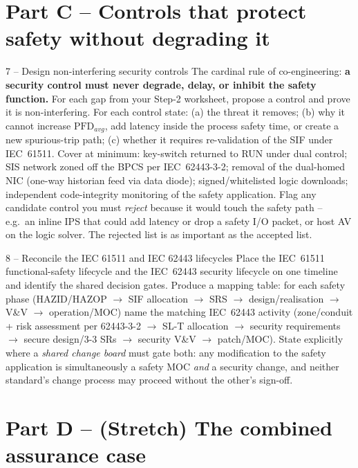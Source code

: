 \documentclass[11pt,a4paper]{article}
\begin{document}
\section*{Part C -- Controls that protect safety without degrading it}

\begin{stepbox}{7 -- Design non-interfering security controls}
The cardinal rule of co-engineering: \textbf{a security control must never
degrade, delay, or inhibit the safety function.} For each gap from your
Step-2 worksheet, propose a control and prove it is non-interfering. For each
control state: (a) the threat it removes; (b) why it cannot increase
$\mathrm{PFD}_{avg}$, add latency inside the process safety time, or create a
new spurious-trip path; (c) whether it requires re-validation of the SIF
under IEC~61511. Cover at minimum: key-switch returned to RUN under dual
control; SIS network zoned off the BPCS per IEC~62443-3-2; removal of the
dual-homed NIC (one-way historian feed via data diode); signed/whitelisted
logic downloads; independent code-integrity monitoring of the safety
application. Flag any candidate control you must \emph{reject} because it
would touch the safety path -- e.g.\ an inline IPS that could add latency or
drop a safety I/O packet, or host AV on the logic solver. The rejected list
is as important as the accepted list.
\end{stepbox}

\begin{stepbox}{8 -- Reconcile the IEC 61511 and IEC 62443 lifecycles}
Place the IEC~61511 functional-safety lifecycle and the IEC~62443
security lifecycle on one timeline and identify the shared decision gates.
Produce a mapping table: for each safety phase (HAZID/HAZOP $\rightarrow$
SIF allocation $\rightarrow$ SRS $\rightarrow$ design/realisation $\rightarrow$
V\&V $\rightarrow$ operation/MOC) name the matching IEC~62443 activity
(zone/conduit + risk assessment per 62443-3-2 $\rightarrow$ SL-T allocation
$\rightarrow$ security requirements $\rightarrow$ secure design/3-3 SRs
$\rightarrow$ security V\&V $\rightarrow$ patch/MOC). State explicitly where a
\emph{shared change board} must gate both: any modification to the safety
application is simultaneously a safety MOC \emph{and} a security change, and
neither standard's change process may proceed without the other's sign-off.
\end{stepbox}

\section*{Part D -- (Stretch) The combined assurance case}
\end{document}
